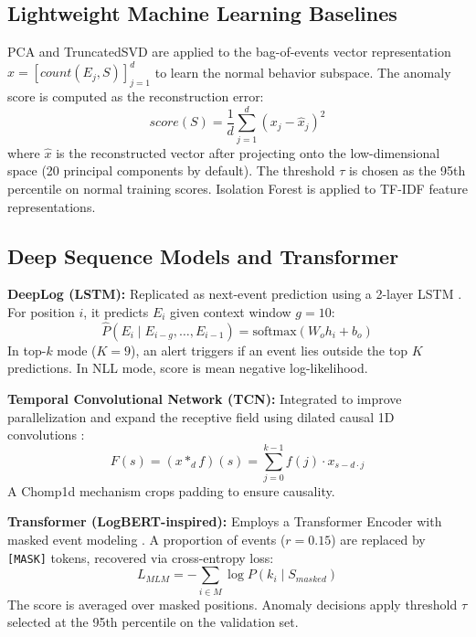 \documentclass[conference]{IEEEtran}
\begin{document}
\subsection{Lightweight Machine Learning Baselines}
PCA and TruncatedSVD are applied to the bag-of-events vector representation $x = [count(E_j, S)]_{j=1}^d$ to learn the normal behavior subspace. The anomaly score is computed as the reconstruction error:
\begin{equation}
score(S)=\frac{1}{d}\sum_{j=1}^{d}(x_j-\hat{x}_j)^2
\label{eq_reconstruction}
\end{equation}
where $\hat{x}$ is the reconstructed vector after projecting onto the low-dimensional space (20 principal components by default). The threshold $\tau$ is chosen as the 95th percentile on normal training scores. Isolation Forest is applied to TF-IDF feature representations.

\subsection{Deep Sequence Models and Transformer}
\textbf{DeepLog (LSTM):} Replicated as next-event prediction using a 2-layer LSTM \cite{b1}. For position $i$, it predicts $E_i$ given context window $g{=}10$:
\begin{equation}
\hat{P}(E_i \mid E_{i-g}, \ldots, E_{i-1}) = \text{softmax}(W_o h_i + b_o)
\end{equation}
In top-$k$ mode ($K{=}9$), an alert triggers if an event lies outside the top $K$ predictions. In NLL mode, score is mean negative log-likelihood.

\textbf{Temporal Convolutional Network (TCN):} Integrated to improve parallelization and expand the receptive field using dilated causal 1D convolutions \cite{b19}:
\begin{equation}
F(s) = (x *_d f)(s) = \sum_{j=0}^{k-1} f(j) \cdot x_{s - d \cdot j}
\end{equation}
A Chomp1d mechanism crops padding to ensure causality.

\textbf{Transformer (LogBERT-inspired):} Employs a Transformer Encoder with masked event modeling \cite{b2}. A proportion of events ($r{=}0.15$) are replaced by \texttt{[MASK]} tokens, recovered via cross-entropy loss:
\begin{equation}
L_{MLM} = -\sum_{i \in M} \log P(k_i \mid S_{masked})
\label{eq_loss}
\end{equation}
The score is averaged over masked positions. Anomaly decisions apply threshold $\tau$ selected at the 95th percentile on the validation set.
\end{document}
